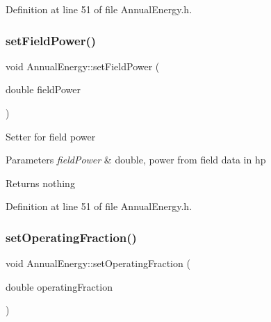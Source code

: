 Definition at line 51 of file Annual\+Energy.\+h.

\mbox{\label{class_annual_energy_a4f7212fcf2f6fcd2b12f36ca26a368a1}} 
\subsubsection{\texorpdfstring{set\+Field\+Power()}{setFieldPower()}\hspace{0.1cm}{\footnotesize\ttfamily [3/3]}}
{\footnotesize\ttfamily void Annual\+Energy\+::set\+Field\+Power (\begin{DoxyParamCaption}\item[{double}]{field\+Power }\end{DoxyParamCaption})\hspace{0.3cm}{\ttfamily [inline]}}

Setter for field power 
\begin{DoxyParams}{Parameters}
{\em field\+Power} & double, power from field data in hp \\
\hline
\end{DoxyParams}
\begin{DoxyReturn}{Returns}
nothing 
\end{DoxyReturn}


Definition at line 51 of file Annual\+Energy.\+h.

\mbox{\label{class_annual_energy_a5c127c7d5e2a5e4f50559f8b546e8998}} 
\subsubsection{\texorpdfstring{set\+Operating\+Fraction()}{setOperatingFraction()}\hspace{0.1cm}{\footnotesize\ttfamily [1/3]}}
{\footnotesize\ttfamily void Annual\+Energy\+::set\+Operating\+Fraction (\begin{DoxyParamCaption}\item[{double}]{operating\+Fraction }\end{DoxyParamCaption})\hspace{0.3cm}{\ttfamily [inline]}}

